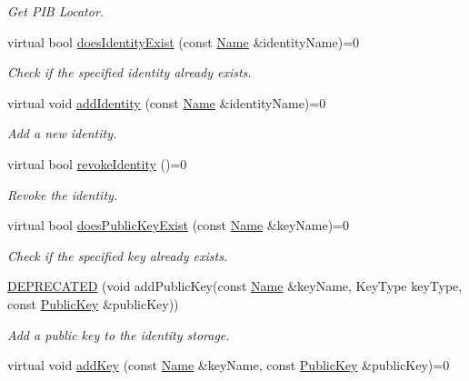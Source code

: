 \begin{DoxyCompactItemize}
\begin{DoxyCompactList}\small\item\em Get P\+IB Locator. \end{DoxyCompactList}\item 
virtual bool \hyperlink{classndn_1_1SecPublicInfo_a2b8fb80dce8c1fe711f3e9372202aa13}{does\+Identity\+Exist} (const \hyperlink{classndn_1_1Name}{Name} \&identity\+Name)=0
\begin{DoxyCompactList}\small\item\em Check if the specified identity already exists. \end{DoxyCompactList}\item 
virtual void \hyperlink{classndn_1_1SecPublicInfo_a7a96cc9f95da95a46c7669b3894a8139}{add\+Identity} (const \hyperlink{classndn_1_1Name}{Name} \&identity\+Name)=0
\begin{DoxyCompactList}\small\item\em Add a new identity. \end{DoxyCompactList}\item 
virtual bool \hyperlink{classndn_1_1SecPublicInfo_a820927737b0cb3a20dd2363d816b97c7}{revoke\+Identity} ()=0
\begin{DoxyCompactList}\small\item\em Revoke the identity. \end{DoxyCompactList}\item 
virtual bool \hyperlink{classndn_1_1SecPublicInfo_aaf1ce7a3d3a700ae0eb42000d4a90417}{does\+Public\+Key\+Exist} (const \hyperlink{classndn_1_1Name}{Name} \&key\+Name)=0
\begin{DoxyCompactList}\small\item\em Check if the specified key already exists. \end{DoxyCompactList}\item 
\hyperlink{classndn_1_1SecPublicInfo_a1c22efbb05dad48fdac5d7a3ac2b5619}{D\+E\+P\+R\+E\+C\+A\+T\+ED} (void add\+Public\+Key(const \hyperlink{classndn_1_1Name}{Name} \&key\+Name, Key\+Type key\+Type, const \hyperlink{classndn_1_1PublicKey}{Public\+Key} \&public\+Key))
\begin{DoxyCompactList}\small\item\em Add a public key to the identity storage. \end{DoxyCompactList}\item 
virtual void \hyperlink{classndn_1_1SecPublicInfo_af166ccfa2ce2b49392297af843c12746}{add\+Key} (const \hyperlink{classndn_1_1Name}{Name} \&key\+Name, const \hyperlink{classndn_1_1PublicKey}{Public\+Key} \&public\+Key)=0

\end{DoxyCompactItemize}
